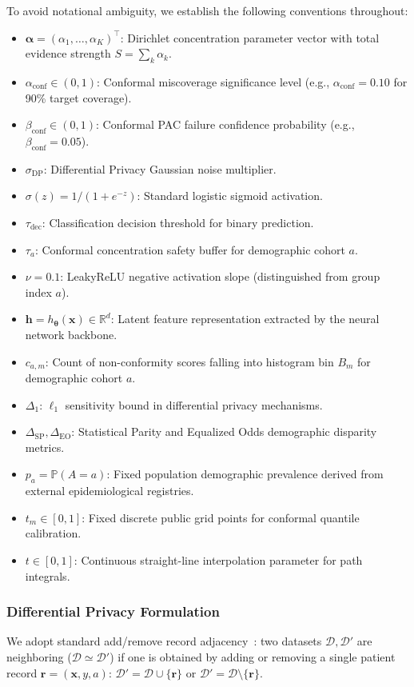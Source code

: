 \documentclass[pdflatex,sn-vancouver-num,referee,lineno]{sn-jnl}
\theoremstyle{thmstyleone}
\theoremstyle{thmstylethree}
\begin{document}
To avoid notational ambiguity, we establish the following conventions throughout:
\begin{itemize}
    \item $\boldsymbol{\alpha} = (\alpha_1, \dots, \alpha_K)^\top$: Dirichlet concentration parameter vector with total evidence strength $S = \sum_k \alpha_k$.
    \item $\alpha_{\text{conf}} \in (0, 1)$: Conformal miscoverage significance level (e.g., $\alpha_{\text{conf}} = 0.10$ for 90\% target coverage).
    \item $\beta_{\text{conf}} \in (0, 1)$: Conformal PAC failure confidence probability (e.g., $\beta_{\text{conf}} = 0.05$).
    \item $\sigma_{\text{DP}}$: Differential Privacy Gaussian noise multiplier.
    \item $\sigma(z) = 1/(1 + e^{-z})$: Standard logistic sigmoid activation.
    \item $\tau_{\text{dec}}$: Classification decision threshold for binary prediction.
    \item $\tau_a$: Conformal concentration safety buffer for demographic cohort $a$.
    \item $\nu = 0.1$: LeakyReLU negative activation slope (distinguished from group index $a$).
    \item $\mathbf{h} = h_{\boldsymbol{\theta}}(\mathbf{x}) \in \mathbb{R}^d$: Latent feature representation extracted by the neural network backbone.
    \item $c_{a, m}$: Count of non-conformity scores falling into histogram bin $B_m$ for demographic cohort $a$.
    \item $\Delta_1$: $\ell_1$ sensitivity bound in differential privacy mechanisms.
    \item $\Delta_{\text{SP}}, \Delta_{\text{EO}}$: Statistical Parity and Equalized Odds demographic disparity metrics.
    \item $p_a = \mathbb{P}(A = a)$: Fixed population demographic prevalence derived from external epidemiological registries.
    \item $t_m \in [0, 1]$: Fixed discrete public grid points for conformal quantile calibration.
    \item $t \in [0, 1]$: Continuous straight-line interpolation parameter for path integrals.
\end{itemize}

\subsubsection{Differential Privacy Formulation}
We adopt standard add/remove record adjacency~\cite{dwork2014algorithmic}: two datasets $\mathcal{D}, \mathcal{D}'$ are neighboring ($\mathcal{D} \simeq \mathcal{D}'$) if one is obtained by adding or removing a single patient record $\mathbf{r} = (\mathbf{x}, y, a)$: $\mathcal{D}' = \mathcal{D} \cup \{\mathbf{r}\}$ or $\mathcal{D}' = \mathcal{D} \setminus \{\mathbf{r}\}$.
\end{document}
